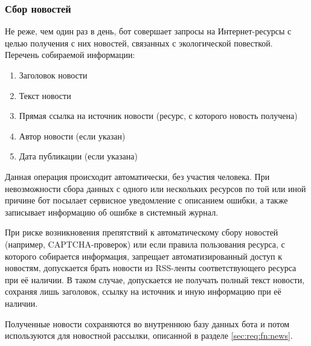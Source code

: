 \subsubsection{Сбор новостей}
    \label{sec:req:fn:grabnews}
    Не реже, чем один раз в день, бот совершает запросы на Интернет-ресурсы с целью получения с них
    новостей, связанных с экологической повесткой. Перечень собираемой информации:
    \begin{enumerate}
        \item
            Заголовок новости
        \item
            Текст новости
        \item
            Прямая ссылка на источник новости (ресурс, с которого новость получена)
        \item
            Автор новости (если указан)
        \item
            Дата публикации (если указана)
    \end{enumerate}

    Данная операция происходит автоматически, без участия человека. При невозможности сбора данных
    с одного или нескольких ресурсов по той или иной причине бот посылает сервисное уведомление
    с описанием ошибки, а также записывает информацию об ошибке в системный журнал.

    При риске возникновения препятствий к автоматическому сбору новостей (например, CAPTCHA-проверок)
    или если правила пользования ресурса, с которого собирается информация, запрещает автоматизированный
    доступ к новостям, допускается брать новости из RSS-ленты соответствующего ресурса при её наличии.
    В таком случае, допускается не получать полный текст новости, сохраняя лишь заголовок,
    ссылку на источник и иную информацию при её наличии.

    Полученные новости сохраняются во внутреннюю базу данных бота и потом используются для новостной
    рассылки, описанной в разделе \ref{sec:req:fn:news}.


